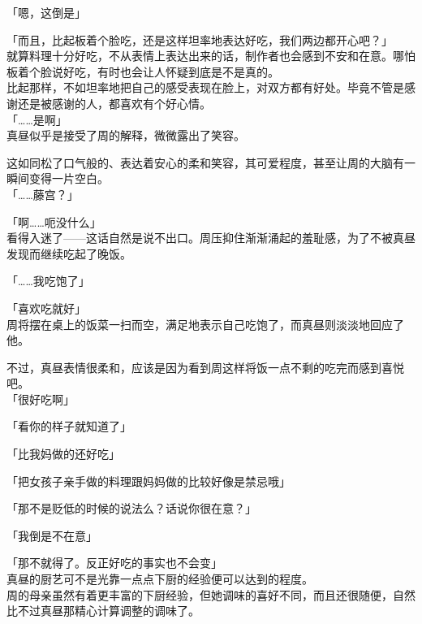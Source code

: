 「嗯，这倒是」

「而且，比起板着个脸吃，还是这样坦率地表达好吃，我们两边都开心吧？」\\

就算料理十分好吃，不从表情上表达出来的话，制作者也会感到不安和在意。哪怕板着个脸说好吃，有时也会让人怀疑到底是不是真的。\\

比起那样，不如坦率地把自己的感受表现在脸上，对双方都有好处。毕竟不管是感谢还是被感谢的人，都喜欢有个好心情。\\

「……是啊」\\

真昼似乎是接受了周的解释，微微露出了笑容。

这如同松了口气般的、表达着安心的柔和笑容，其可爱程度，甚至让周的大脑有一瞬间变得一片空白。\\

「……藤宫？」

「啊……呃没什么」\\

看得入迷了——这话自然是说不出口。周压抑住渐渐涌起的羞耻感，为了不被真昼发现而继续吃起了晚饭。\\

\vspace{2\baselineskip}

「……我吃饱了」

「喜欢吃就好」\\

周将摆在桌上的饭菜一扫而空，满足地表示自己吃饱了，而真昼则淡淡地回应了他。

不过，真昼表情很柔和，应该是因为看到周这样将饭一点不剩的吃完而感到喜悦吧。\\

「很好吃啊」

「看你的样子就知道了」

「比我妈做的还好吃」

「把女孩子亲手做的料理跟妈妈做的比较好像是禁忌哦」

「那不是贬低的时候的说法么？话说你很在意？」

「我倒是不在意」

「那不就得了。反正好吃的事实也不会变」\\

真昼的厨艺可不是光靠一点点下厨的经验便可以达到的程度。\\

周的母亲虽然有着更丰富的下厨经验，但她调味的喜好不同，而且还很随便，自然比不过真昼那精心计算调整的调味了。\\

